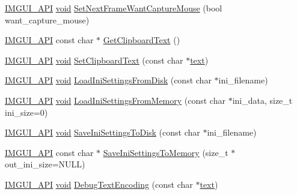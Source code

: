 \begin{DoxyCompactItemize}
\item 
\hyperlink{imgui_8h_a43829975e84e45d1149597467a14bbf5}{I\+M\+G\+U\+I\+\_\+\+A\+PI} \hyperlink{imgui__impl__opengl3__loader_8h_ac668e7cffd9e2e9cfee428b9b2f34fa7}{void} \hyperlink{namespaceImGui_affc347668060a3dfbfae50247eaac7d2}{Set\+Next\+Frame\+Want\+Capture\+Mouse} (bool want\+\_\+capture\+\_\+mouse)
\item 
\hyperlink{imgui_8h_a43829975e84e45d1149597467a14bbf5}{I\+M\+G\+U\+I\+\_\+\+A\+PI} const char $\ast$ \hyperlink{namespaceImGui_a11837daee819fd90e17d80ab1eef1f99}{Get\+Clipboard\+Text} ()
\item 
\hyperlink{imgui_8h_a43829975e84e45d1149597467a14bbf5}{I\+M\+G\+U\+I\+\_\+\+A\+PI} \hyperlink{imgui__impl__opengl3__loader_8h_ac668e7cffd9e2e9cfee428b9b2f34fa7}{void} \hyperlink{namespaceImGui_aa4824a1b351c063b4aff9b9f4fb5fd4d}{Set\+Clipboard\+Text} (const char $\ast$\hyperlink{game__play__state_8cpp_a295b62c787445f811e691da4b10f6be4}{text})
\item 
\hyperlink{imgui_8h_a43829975e84e45d1149597467a14bbf5}{I\+M\+G\+U\+I\+\_\+\+A\+PI} \hyperlink{imgui__impl__opengl3__loader_8h_ac668e7cffd9e2e9cfee428b9b2f34fa7}{void} \hyperlink{namespaceImGui_a4bf22fb84ba768fc18383af50e8c217f}{Load\+Ini\+Settings\+From\+Disk} (const char $\ast$ini\+\_\+filename)
\item 
\hyperlink{imgui_8h_a43829975e84e45d1149597467a14bbf5}{I\+M\+G\+U\+I\+\_\+\+A\+PI} \hyperlink{imgui__impl__opengl3__loader_8h_ac668e7cffd9e2e9cfee428b9b2f34fa7}{void} \hyperlink{namespaceImGui_a8e37b6a0b2feb6cd6ac61a4259392861}{Load\+Ini\+Settings\+From\+Memory} (const char $\ast$ini\+\_\+data, size\+\_\+t ini\+\_\+size=0)
\item 
\hyperlink{imgui_8h_a43829975e84e45d1149597467a14bbf5}{I\+M\+G\+U\+I\+\_\+\+A\+PI} \hyperlink{imgui__impl__opengl3__loader_8h_ac668e7cffd9e2e9cfee428b9b2f34fa7}{void} \hyperlink{namespaceImGui_afa4985e7810be4e687bc4ff28cec8a4d}{Save\+Ini\+Settings\+To\+Disk} (const char $\ast$ini\+\_\+filename)
\item 
\hyperlink{imgui_8h_a43829975e84e45d1149597467a14bbf5}{I\+M\+G\+U\+I\+\_\+\+A\+PI} const char $\ast$ \hyperlink{namespaceImGui_a27043a530e0e842e01c279dd4207f9eb}{Save\+Ini\+Settings\+To\+Memory} (size\+\_\+t $\ast$out\+\_\+ini\+\_\+size=N\+U\+LL)
\item 
\hyperlink{imgui_8h_a43829975e84e45d1149597467a14bbf5}{I\+M\+G\+U\+I\+\_\+\+A\+PI} \hyperlink{imgui__impl__opengl3__loader_8h_ac668e7cffd9e2e9cfee428b9b2f34fa7}{void} \hyperlink{namespaceImGui_a326f0badd138d1dea078a31b0e8dd685}{Debug\+Text\+Encoding} (const char $\ast$\hyperlink{game__play__state_8cpp_a295b62c787445f811e691da4b10f6be4}{text})

\end{DoxyCompactItemize}
